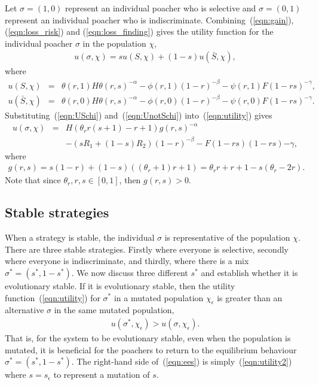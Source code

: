 \documentclass[10pt]{article}
\begin{document}
Let  $\sigma = (1,0)$ represent an individual poacher who is selective and $\sigma = (0,1)$ represent an individual poacher who is indiscriminate. Combining~(\ref{eqn:gain}), (\ref{eqn:loss_risk}) and (\ref{eqn:loss_finding}) gives the utility function for the individual poacher $\sigma$ in the population $\chi$, 
\begin{eqnarray}
\label{eqn:utility}
u(\sigma, \chi) = s u(S,\chi) +(1-s) u(\bar{S},\chi), 
\end{eqnarray}
where
\begin{eqnarray}
\label{eqn:USchi}
u(S,\chi) &=& \theta(r,1) H \theta(r,s)^{-\alpha}
- \phi(r,1) (1-r)^{-\beta} 
- \psi(r,1) F(1-rs)^{-\gamma} ,
\\
\label{eqn:UnotSchi}
u(\bar{S},\chi) &=& \theta(r,0) H \theta(r,s)^{-\alpha}
- \phi(r,0) (1-r)^{-\beta}
- \psi(r,0) F(1-rs)^{-\gamma}.
\end{eqnarray}
Substituting~(\ref{eqn:USchi}) and~(\ref{eqn:UnotSchi}) into~(\ref{eqn:utility}) gives
\begin{eqnarray}
\label{eqn:utility2}
u(\sigma, \chi) &=& 
H (\theta_r r(s+1)-r+1)g(r,s)^{-\alpha} \\ \nonumber &&
-
(sR_1 + (1-s)R_2)(1-r)^{-\beta} - F(1-rs)(1-rs){-\gamma},
\end{eqnarray}
where 
\begin{eqnarray}
\label{eqn:g}
g(r,s) = s(1-r)+(1-s)((\theta_r+1)r+1) = \theta_r r + r + 1 - s(\theta_r - 2r).
\end{eqnarray}
Note that since $\theta_r, r, s  \in [0,1]$, then $g(r,s)>0$.
\subsection{Stable strategies}
When a strategy is stable, the individual $\sigma$ is representative of the population $\chi$. There are three stable strategies. Firstly where everyone is selective, secondly where everyone is indiscriminate, and thirdly, where there is a mix $\sigma^* = (s^*,1-s^*)$. We now discuss three different $s^*$ and establish whether it is evolutionary stable. If it is evolutionary stable, then the utility function~(\ref{eqn:utility}) for $\sigma^*$ in a mutated population $\chi_\epsilon$ is greater than an alternative $\sigma$ in the same mutated population,
\begin{eqnarray}
\label{eqn:ees}
u(\sigma^*,\chi_\epsilon) > u(\sigma,\chi_\epsilon).
\end{eqnarray}
That is, for the system to be evolutionary stable, even when the population is mutated, it is beneficial for the poachers to return to the equilibrium behaviour $\sigma^* = (s^*,1-s^*)$. The right-hand side of~(\ref{eqn:ees}) is simply~(\ref{eqn:utility2}) where $s=s_\epsilon$ to represent a mutation of $s$.
\end{document}
